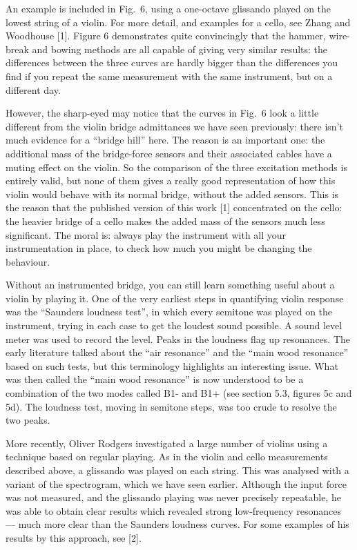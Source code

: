   An example is included in Fig.\ 6, using a one-octave glissando played on the 
  lowest string of a violin. For more detail, and examples for a cello, see 
  Zhang and Woodhouse [1]. Figure 6 demonstrates quite convincingly that the 
  hammer, wire-break and bowing methods are all capable of giving very similar 
  results: the differences between the three curves are hardly bigger than the 
  differences you find if you repeat the same measurement with the same 
  instrument, but on a different day. 

  However, the sharp-eyed may notice that the curves in Fig.\ 6 look a little 
  different from the violin bridge admittances we have seen previously: there 
  isn't much evidence for a ``bridge hill'' here. The reason is an important 
  one: the additional mass of the bridge-force sensors and their associated 
  cables have a muting effect on the violin. So the comparison of the three 
  excitation methods is entirely valid, but none of them gives a really good 
  representation of how this violin would behave with its normal bridge, 
  without the added sensors. This is the reason that the published version of 
  this work [1] concentrated on the cello: the heavier bridge of a cello makes 
  the added mass of the sensors much less significant. The moral is: always 
  play the instrument with all your instrumentation in place, to check how much 
  you might be changing the behaviour. 

  Without an instrumented bridge, you can still learn something useful about a 
  violin by playing it. One of the very earliest steps in quantifying violin 
  response was the “Saunders loudness test”, in which every semitone was played 
  on the instrument, trying in each case to get the loudest sound possible. A 
  sound level meter was used to record the level. Peaks in the loudness flag up 
  resonances. The early literature talked about the “air resonance” and the 
  “main wood resonance” based on such tests, but this terminology highlights an 
  interesting issue. What was then called the “main wood resonance” is now 
  understood to be a combination of the two modes called B1- and B1+ (see 
  section 5.3, figures 5c and 5d). The loudness test, moving in semitone steps, 
  was too crude to resolve the two peaks. 

  More recently, Oliver Rodgers investigated a large number of violins using a 
  technique based on regular playing. As in the violin and cello measurements 
  described above, a glissando was played on each string. This was analysed 
  with a variant of the spectrogram, which we have seen earlier. Although the 
  input force was not measured, and the glissando playing was never precisely 
  repeatable, he was able to obtain clear results which revealed strong 
  low-frequency resonances — much more clear than the Saunders loudness curves. 
  For some examples of his results by this approach, see [2]. 

